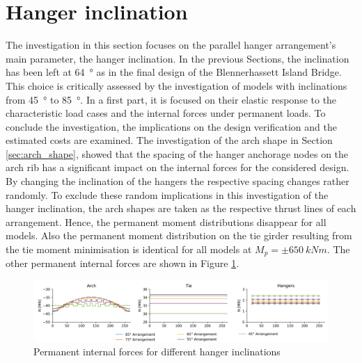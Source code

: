 \section{Hanger inclination}
The investigation in this section focuses on the parallel hanger arrangement's main parameter, the hanger inclination. In the previous Sections, the inclination has been left at \SI{64}{\degree} as in the final design of the Blennerhassett Island Bridge. This choice is critically assessed by the investigation of models with inclinations from \SI{45}{\degree} to \SI{85}{\degree}. In a first part, it is focused on their elastic response to the characteristic load cases and the internal forces under permanent loads.  To conclude the investigation, the implications on the design verification and the estimated costs are examined. 
The investigation of the arch shape in Section \ref{sec:arch_shape}, showed that the spacing of the hanger anchorage nodes on the arch rib has a significant impact on the internal forces for the considered design. By changing the inclination of the hangers the respective spacing changes rather randomly. To exclude these random implications in this investigation of the hanger inclination, the arch shapes are taken as the respective thrust lines of each arrangement. Hence, the permanent moment distributions disappear for all models. Also the permanent moment distribution on the tie girder resulting from the tie moment minimisation is identical for all models at $M_p=\pm \SI{650}{kNm}$. The other permanent internal forces are shown in Figure \ref{fig:inclination_permanent}.

\begin{figure}[H]
    \centering
    \includegraphics[trim={1cm 0 13cm 0},clip, width=\textwidth]{calculations/parallel arrangement comparison/permanent_plot.png}
    \caption{Permanent internal forces for different hanger inclinations}
    \label{fig:inclination_permanent}
\end{figure}

